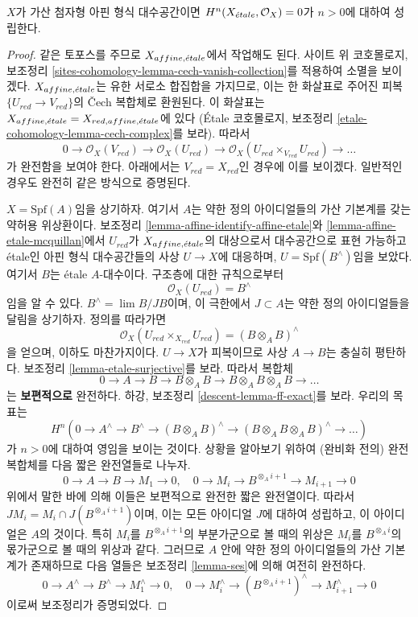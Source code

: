 \begin{lemma}
\label{lemma-higher-vanishing-structure-sheaf}
$X$가 가산 첨자형 아핀 형식 대수공간이면
$H^n(X_{\acute{e}tale}, \mathcal{O}_X) = 0$가 $n > 0$에 대하여 성립한다.
\end{lemma}

\begin{proof}
같은 토포스를 주므로 $X_{affine, {\acute{e}tale}}$에서 작업해도 된다.
사이트 위 코호몰로지, 보조정리
\ref{sites-cohomology-lemma-cech-vanish-collection}를 적용하여
소멸을 보이겠다. $X_{affine, {\acute{e}tale}}$는 유한 서로소 합집합을 가지므로,
이는 한 화살표로 주어진 피복 $\{U_{red} \to V_{red}\}$의
{\v C}ech 복합체로 환원된다. 이 화살표는
$X_{affine, {\acute{e}tale}} = X_{red, affine, {\acute{e}tale}}$에 있다
(\'Etale 코호몰로지, 보조정리
\ref{etale-cohomology-lemma-cech-complex}를 보라).
따라서
$$
0 \to \mathcal{O}_X(V_{red}) \to \mathcal{O}_X(U_{red}) \to
\mathcal{O}_X(U_{red} \times_{V_{red}} U_{red}) \to \ldots
$$
가 완전함을 보여야 한다. 아래에서는 $V_{red} = X_{red}$인
경우에 이를 보이겠다. 일반적인 경우도 완전히 같은 방식으로 증명된다.

\medskip\noindent
$X = \text{Spf}(A)$임을 상기하자. 여기서 $A$는 약한 정의
아이디얼들의 가산 기본계를 갖는 약허용 위상환이다.
보조정리 \ref{lemma-affine-identify-affine-etale}와
\ref{lemma-affine-etale-mcquillan}에서 $U_{red}$가
$X_{affine, {\acute{e}tale}}$의 대상으로서 대수공간으로 표현 가능하고 \'etale인 아핀 형식
대수공간들의 사상 $U \to X$에 대응하며,
$U = \text{Spf}(B^\wedge)$임을 보았다. 여기서 $B$는 \'etale
$A$-대수이다. 구조층에 대한 규칙으로부터
$$
\mathcal{O}_X(U_{red}) = B^\wedge
$$
임을 알 수 있다. $B^\wedge = \lim B/JB$이며, 이 극한에서
$J \subset A$는 약한 정의 아이디얼들을 달림을 상기하자.
정의를 따라가면
$$
\mathcal{O}_X(U_{red} \times_{X_{red}} U_{red}) = (B \otimes_A B)^\wedge
$$
을 얻으며, 이하도 마찬가지이다. $U \to X$가 피복이므로 사상
$A \to B$는 충실히 평탄하다. 보조정리
\ref{lemma-etale-surjective}를 보라. 따라서 복합체
$$
0 \to A \to B \to B \otimes_A B \to B \otimes_A B \otimes_A B \to \ldots
$$
는 {\bf 보편적으로} 완전하다. 하강, 보조정리
\ref{descent-lemma-ff-exact}를 보라. 우리의 목표는
$$
H^n(0 \to A^\wedge \to B^\wedge \to (B \otimes_A B)^\wedge
\to (B \otimes_A B \otimes_A B)^\wedge \to \ldots)
$$
가 $n > 0$에 대하여 영임을 보이는 것이다. 상황을 알아보기 위하여
(완비화 전의) 완전 복합체를 다음 짧은 완전열들로 나누자.
$$
0 \to A \to B \to M_1 \to 0,\quad
0 \to M_i \to B^{\otimes_A i + 1} \to M_{i + 1} \to 0
$$
위에서 말한 바에 의해 이들은 보편적으로 완전한 짧은 완전열이다.
따라서 $JM_i = M_i \cap J(B^{\otimes_A i + 1})$이며, 이는 모든
아이디얼 $J$에 대하여 성립하고, 이 아이디얼은 $A$의 것이다. 특히
$M_i$를 $B^{\otimes_A i + 1}$의 부분가군으로 볼 때의 위상은
$M_i$를 $B^{\otimes_A i}$의 몫가군으로 볼 때의 위상과 같다.
그러므로 $A$ 안에 약한 정의 아이디얼들의 가산 기본계가 존재하므로
다음 열들은 보조정리 \ref{lemma-ses}에 의해 여전히 완전하다.
$$
0 \to A^\wedge \to B^\wedge \to M_1^\wedge \to 0,\quad
0 \to M_i^\wedge \to (B^{\otimes_A i + 1})^\wedge \to M_{i + 1}^\wedge \to 0
$$
이로써 보조정리가 증명되었다.
\end{proof}


